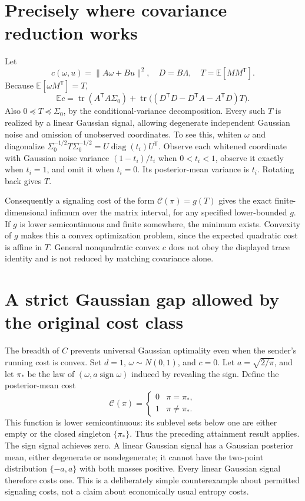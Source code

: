 \documentclass[11pt]{article}
\newcommand{\E}{\mathbb E}
\begin{document}
\section*{Precisely where covariance reduction works}
Let
\[
 c(\omega,u)=\|A\omega+Bu\|^2,
 \quad D=B\Lambda,\quad T=\E[MM^{\mathsf T}].
\]
Because $\E[\omega M^{\mathsf T}]=T$,
\[
 \E c=\operatorname{tr}(A^{\mathsf T}A\Sigma_0)
 +\operatorname{tr}\bigl((D^{\mathsf T}D-D^{\mathsf T}A-A^{\mathsf T}D)T\bigr).
\]
Also $0\preceq T\preceq\Sigma_0$, by the conditional-variance decomposition. Every such $T$ is realized by a linear Gaussian signal, allowing degenerate independent Gaussian noise and omission of unobserved coordinates. To see this, whiten $\omega$ and diagonalize $\Sigma_0^{-1/2}T\Sigma_0^{-1/2}=U\operatorname{diag}(t_i)U^{\mathsf T}$. Observe each whitened coordinate with Gaussian noise variance $(1-t_i)/t_i$ when $0<t_i<1$, observe it exactly when $t_i=1$, and omit it when $t_i=0$. Its posterior-mean variance is $t_i$. Rotating back gives $T$.

Consequently a signaling cost of the form $\mathcal C(\pi)=g(T)$ gives the exact finite-dimensional infimum over the matrix interval, for any specified lower-bounded $g$. If $g$ is lower semicontinuous and finite somewhere, the minimum exists. Convexity of $g$ makes this a convex optimization problem, since the expected quadratic cost is affine in $T$. General nonquadratic convex $c$ does not obey the displayed trace identity and is not reduced by matching covariance alone.

\section*{A strict Gaussian gap allowed by the original cost class}
The breadth of $C$ prevents universal Gaussian optimality even when the sender's running cost is convex. Set $d=1$, $\omega\sim N(0,1)$, and $c=0$. Let $a=\sqrt{2/\pi}$, and let $\pi_*$ be the law of $(\omega,a\operatorname{sign}\omega)$ induced by revealing the sign. Define the posterior-mean cost
\[
 \mathcal C(\pi)=\begin{cases}0&\pi=\pi_*,\\1&\pi\ne\pi_* .\end{cases}
\]
This function is lower semicontinuous: its sublevel sets below one are either empty or the closed singleton $\{\pi_*\}$. Thus the preceding attainment result applies. The sign signal achieves zero. A linear Gaussian signal has a Gaussian posterior mean, either degenerate or nondegenerate; it cannot have the two-point distribution $\{-a,a\}$ with both masses positive. Every linear Gaussian signal therefore costs one. This is a deliberately simple counterexample about permitted signaling costs, not a claim about economically usual entropy costs.
\end{document}
